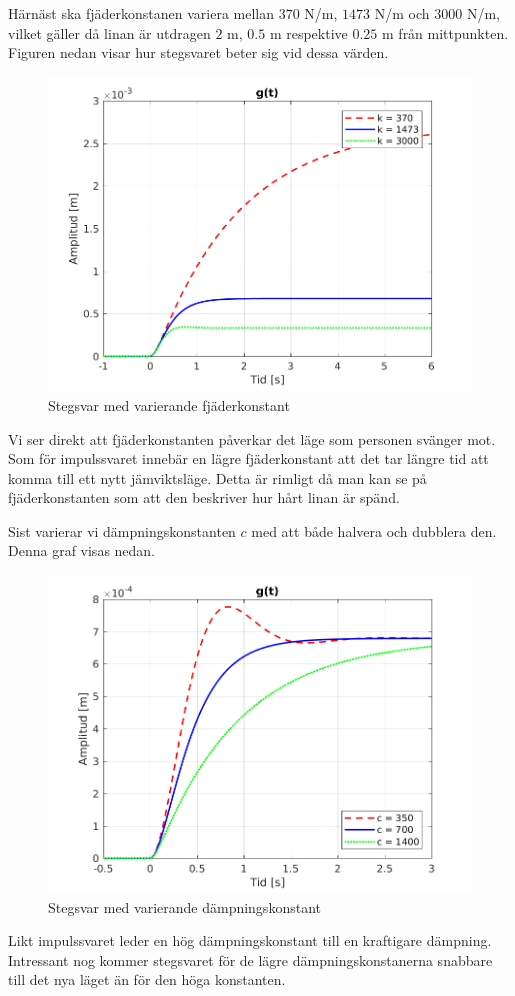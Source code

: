 \newpage
Härnäst ska fjäderkonstanen variera mellan $370$ N/m, $1473$ N/m och $3000$ N/m, vilket gäller då linan är utdragen $2$ m, $0.5$ m respektive $0.25$ m från mittpunkten. Figuren nedan visar hur stegsvaret beter sig vid dessa värden.
\begin{figure}[H]
    \centering
    \includegraphics[scale=0.9]{bilder/stegsvar_variation_k}
    \caption{Stegsvar med varierande fjäderkonstant}
    \label{fig:stegsvar_variation_k}
\end{figure}
Vi ser direkt att fjäderkonstanten påverkar det läge som personen svänger mot. Som för impulssvaret innebär en lägre fjäderkonstant att det tar längre tid att komma till ett nytt jämviktsläge. Detta är rimligt då man kan se på fjäderkonstanten som att den beskriver hur hårt linan är spänd.

\newpage
Sist varierar vi dämpningskonstanten $c$ med att både halvera och dubblera den. Denna graf visas nedan.
\begin{figure}[H]
    \centering
    \includegraphics[scale=0.9]{bilder/stegsvar_variation_c}
    \caption{Stegsvar med varierande dämpningskonstant}
    \label{fig:stegsvar_variation_c}
\end{figure}
Likt impulssvaret leder en hög dämpningskonstant till en kraftigare dämpning. Intressant nog kommer stegsvaret för de lägre dämpningskonstanerna snabbare till det nya läget än för den höga konstanten. 

